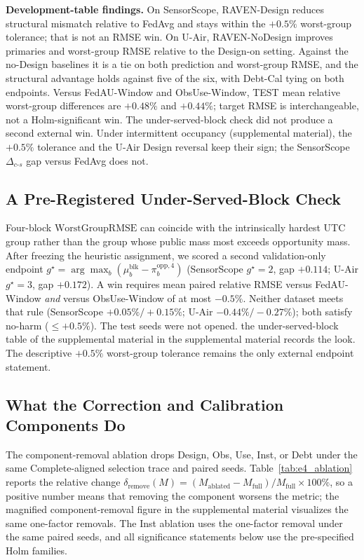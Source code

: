 \documentclass[letterpaper,journal]{IEEEtran}
\begin{document}
\noindent\textbf{Development-table findings.}
On SensorScope, RAVEN-Design reduces structural mismatch relative to
FedAvg and stays within the $+0.5\%$ worst-group tolerance; that is not
an RMSE win.  On U-Air,
RAVEN-NoDesign improves primaries and worst-group RMSE relative to the
Design-on setting.  Against the no-Design baselines it is a tie on both
prediction and worst-group RMSE, and the structural advantage holds against
five of the six, with Debt-Cal tying on both endpoints.  Versus FedAU-Window and
ObsUse-Window,
TEST mean relative worst-group differences are $+0.48\%$ and $+0.44\%$;
target RMSE is interchangeable, not a Holm-significant win.
The under-served-block check did not produce a second external win.
Under intermittent occupancy (supplemental material), the $+0.5\%$
tolerance and the U-Air Design reversal keep their sign; the SensorScope
$\Delta_{c\text{-}s}$ gap versus FedAvg does not.

\subsection{A Pre-Registered Under-Served-Block Check}
\label{subsec:eval_underserved}

Four-block $\mathrm{WorstGroupRMSE}$ can coincide with the intrinsically
hardest UTC group rather than the group whose public mass most exceeds
opportunity mass.  After freezing the heuristic assignment, we scored a
second validation-only endpoint
$g^{\star}=\arg\max_b(\mu^{\mathrm{blk}}_b-\pi^{\mathrm{opp},4}_b)$
(SensorScope $g^{\star}=2$, gap $+0.114$; U-Air $g^{\star}=3$, gap
$+0.172$).  A win requires mean paired relative RMSE versus FedAU-Window
\emph{and} versus ObsUse-Window of at most $-0.5\%$.
Neither dataset meets that rule (SensorScope $+0.05\%/+0.15\%$;
U-Air $-0.44\%/-0.27\%$); both satisfy no-harm ($\le+0.5\%$).
The test seeds were not opened.  the under-served-block table of the supplemental material in
the supplemental material records the look.  The descriptive
$+0.5\%$ worst-group tolerance remains the only external endpoint statement.

\subsection{What the Correction and Calibration Components Do}
\label{subsec:eval_rq3}

The component-removal ablation drops Design, Obs, Use, Inst, or Debt under the same
Complete-aligned selection trace and paired seeds.
Table~\ref{tab:e4_ablation} reports the relative change
$\delta_{\mathrm{remove}}(M)
=(M_{\mathrm{ablated}}-M_{\mathrm{full}})/M_{\mathrm{full}}\times100\%$,
so a positive number means that removing the component worsens the metric;
the magnified component-removal figure in the supplemental material visualizes the
same one-factor removals.
The Inst ablation uses the one-factor removal under the same paired seeds, and
all significance statements below use the pre-specified Holm families.
\end{document}
